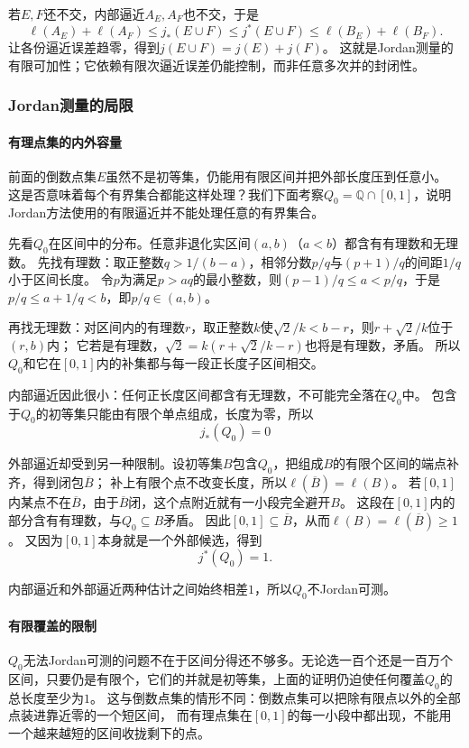 若$E,F$还不交，内部逼近$A_E,A_F$也不交，于是
\[
 \ell(A_E)+\ell(A_F)
 \leq j_*(E\cup F)\leq j^*(E\cup F)
 \leq\ell(B_E)+\ell(B_F).
\]
让各份逼近误差趋零，得到$j(E\cup F)=j(E)+j(F)$。
这就是Jordan测量的有限可加性；它依赖有限次逼近误差仍能控制，而非任意多次并的封闭性。

\subsubsection{Jordan测量的局限}

\paragraph{有理点集的内外容量}

前面的倒数点集$E$虽然不是初等集，仍能用有限区间并把外部长度压到任意小。
这是否意味着每个有界集合都能这样处理？我们下面考察$Q_0=\mathbb Q\cap[0,1]$，说明Jordan方法使用的有限逼近并不能处理任意的有界集合。

先看$Q_0$在区间中的分布。任意非退化实区间$(a,b)$（$a<b$）都含有有理数和无理数。
先找有理数：取正整数$q>1/(b-a)$，相邻分数$p/q$与$(p+1)/q$的间距$1/q$小于区间长度。
令$p$为满足$p>aq$的最小整数，则$(p-1)/q\leq a<p/q$，于是$p/q\leq a+1/q<b$，即$p/q\in(a,b)$。

再找无理数：对区间内的有理数$r$，取正整数$k$使$\sqrt2/k<b-r$，则$r+\sqrt2/k$位于$(r,b)$内；
它若是有理数，$\sqrt2=k(r+\sqrt2/k-r)$也将是有理数，矛盾。
所以$Q_0$和它在$[0,1]$内的补集都与每一段正长度子区间相交。

内部逼近因此很小：任何正长度区间都含有无理数，不可能完全落在$Q_0$中。
包含于$Q_0$的初等集只能由有限个单点组成，长度为零，所以
\[ 
 j_*(Q_0)=0
\]

外部逼近却受到另一种限制。设初等集$B$包含$Q_0$，把组成$B$的有限个区间的端点补齐，得到闭包$\overline B$；
补上有限个点不改变长度，所以$\ell(\overline B)=\ell(B)$。
若$[0,1]$内某点不在$\overline B$，由于$\overline B$闭，这个点附近就有一小段完全避开$B$。
这段在$[0,1]$内的部分含有有理数，与$Q_0\subseteq B$矛盾。
因此$[0,1]\subseteq\overline B$，从而$\ell(B) = \ell(\overline B) \geq 1$。
又因为$[0,1]$本身就是一个外部候选，得到
\[
 j^*(Q_0)=1.
\]

内部逼近和外部逼近两种估计之间始终相差$1$，所以$Q_0$不Jordan可测。

\paragraph{有限覆盖的限制}

$Q_0$无法Jordan可测的问题不在于区间分得还不够多。无论选一百个还是一百万个区间，只要仍是有限个，它们的并就是初等集，上面的证明仍迫使任何覆盖$Q_0$的总长度至少为$1$。
这与倒数点集的情形不同：倒数点集可以把除有限点以外的全部点装进靠近零的一个短区间，
而有理点集在$[0,1]$的每一小段中都出现，不能用一个越来越短的区间收拢剩下的点。

